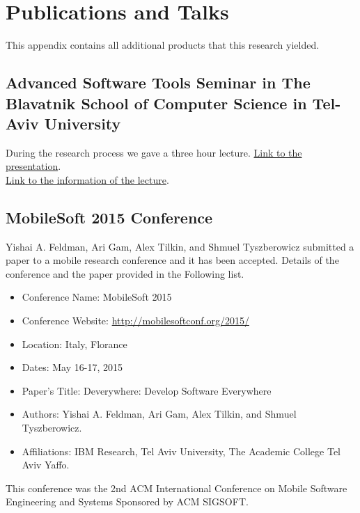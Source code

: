 \chapter{Publications and Talks}
This appendix contains all additional products that this research yielded.

\section{Advanced Software Tools Seminar in The Blavatnik School of Computer Science in Tel-Aviv University}
During the research process we gave a three hour lecture. \href{https://www.icloud.com/keynote/AwBWCAESEMmhJ9LSgI9wRLhfRTk81c4aKj7lviy1R3R9Yf61KLkOjxnc8qt5FRwhMAmuF5qYNCPOZK9QGyrifKcccAMCUCAQEEIDx6Kr_gzGatd8ip7oAT1CRKjYgJolac-V7YeH3kQRO3#Deverywhere-TAU}{Link to the presentation}.
\\\href{http://www.cs.tau.ac.il/~amiramy/SoftwareSeminar/alexTilkinJan2015.html}{Link to the information of the lecture}.
\section{MobileSoft 2015 Conference}
Yishai A. Feldman, Ari Gam, Alex Tilkin, and Shmuel Tyszberowicz submitted a paper to a mobile research conference and it has been accepted. Details of the conference and the paper provided in the Following list.
\begin{itemize}
	\item Conference Name: MobileSoft 2015
	\item Conference Website: \url{http://mobilesoftconf.org/2015/}
	\item Location: Italy, Florance
	\item Dates: May 16-17, 2015
	\item Paper's Title: Deverywhere: Develop Software Everywhere
	\item Authors: Yishai A. Feldman, Ari Gam, Alex Tilkin, and Shmuel Tyszberowicz.
	\item Affiliations: IBM Research, Tel Aviv University, The Academic College Tel Aviv Yaffo.
\end{itemize}
This conference was the 2nd ACM International Conference on Mobile Software Engineering and Systems Sponsored by ACM SIGSOFT.
